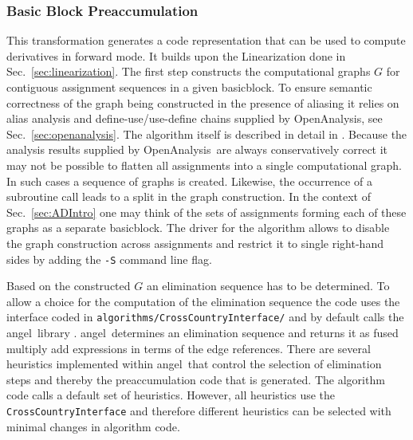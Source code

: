 \documentclass{book}
\newcommand{\angel}{angel}
\newcommand{\basicblock}{basicblock}
\newcommand{\OpenAnalysis}{OpenAnalysis}
\newcommand{\refsec}[1]{{Sec.~\ref{#1}}}
\begin{document}
\subsubsection{Basic Block Preaccumulation}\label{sec:BBPreacc}

This transformation generates a code representation that can be used 
to compute derivatives in forward mode. It builds upon the Linearization
done in \refsec{sec:linearization}. 
The first step constructs the 
computational graphs $G$ 
for contiguous 
assignment sequences in a given \basicblock. To ensure semantic 
correctness of the graph being constructed in the presence of 
aliasing it relies on alias analysis and define-use/use-define chains 
supplied by \OpenAnalysis, see \refsec{sec:openanalysis}.
The algorithm itself is described in detail in \cite{Utk04FBB}.
Because the analysis results supplied by \OpenAnalysis\ are always 
conservatively correct it may not be possible to flatten all 
assignments into a single computational graph. In such cases 
a sequence of graphs is created. Likewise, the occurrence 
of a subroutine call leads to a split in the graph construction. 
In the context of \refsec{sec:ADIntro} one may think of the sets of 
assignments forming each of these graphs as a separate \basicblock. 
The driver for the algorithm allows to disable 
the graph construction across assignments and restrict it to 
single right-hand sides by adding the \lstinline{-S} command 
line flag. 

Based on the constructed $G$ an elimination sequence has to be determined.
To allow a choice for the computation of the elimination sequence 
the code uses the interface coded in \lstinline{algorithms/CrossCountryInterface/}
and by default calls the \angel\ library \cite{angelWeb,AGN03,SAGA}.
\angel\ determines an elimination sequence and returns it as 
fused multiply add expressions in terms of the edge references.
There are several heuristics implemented within \angel\ that control 
the selection of elimination steps and thereby the preaccumulation code 
that is generated.  The algorithm code calls a default set of heuristics. 
However, all heuristics use the \lstinline{CrossCountryInterface} and therefore 
different heuristics can be selected with minimal changes in algorithm code.   
\end{document}
